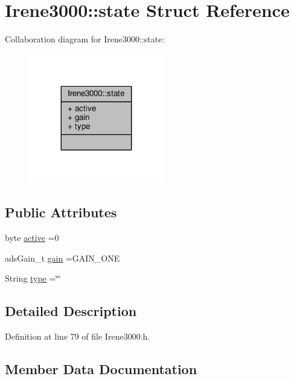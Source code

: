 \hypertarget{structIrene3000_1_1state}{}\section{Irene3000\+:\+:state Struct Reference}
\label{structIrene3000_1_1state}


Collaboration diagram for Irene3000\+:\+:state\+:\nopagebreak
\begin{figure}[H]
\begin{center}
\leavevmode
\includegraphics[width=167pt]{structIrene3000_1_1state__coll__graph}
\end{center}
\end{figure}
\subsection*{Public Attributes}
\begin{DoxyCompactItemize}
\item 
byte \hyperlink{structIrene3000_1_1state_af7ff649f20b9a2fb6ca0f949ee9a25ce}{active} =0
\item 
ads\+Gain\+\_\+t \hyperlink{structIrene3000_1_1state_a1ecf69d38cb31ecaf6b3602a3f3e93cb}{gain} =G\+A\+I\+N\+\_\+\+O\+NE
\item 
String \hyperlink{structIrene3000_1_1state_a9897a7e02727db6351d44006eec73799}{type} =\char`\"{}\char`\"{}
\end{DoxyCompactItemize}


\subsection{Detailed Description}


Definition at line 79 of file Irene3000.\+h.



\subsection{Member Data Documentation}
\mbox{\label{structIrene3000_1_1state_af7ff649f20b9a2fb6ca0f949ee9a25ce}} 
